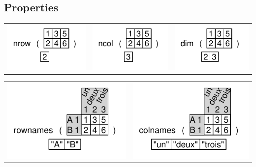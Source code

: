 \documentclass[pdflatex]{article}
\begin{document}
\subsection{Properties}

\begin{tabular}{ccc}
\includegraphics{nrow.pdf} & \includegraphics{ncol.pdf} & \includegraphics{dim.pdf}
\end{tabular}

\begin{tabular}{cc}
\includegraphics{rownames.pdf} & \includegraphics{colnames.pdf}
\end{tabular}
\end{document}
